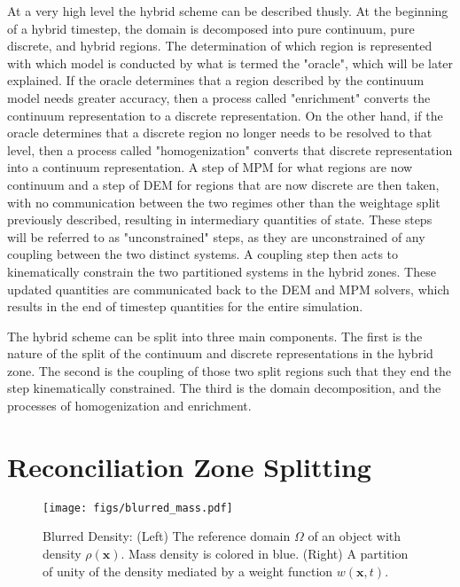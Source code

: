 At a very high level the hybrid scheme can be described thusly. At the beginning of a hybrid timestep, the domain is decomposed into pure continuum, pure discrete, and hybrid regions. The determination of which region is represented with which model is conducted by what is termed the "oracle", which will be later explained. If the oracle determines that a region described by the continuum model needs greater accuracy, then a process called "enrichment" converts the continuum representation to a discrete representation. On the other hand, if the oracle determines that a discrete region no longer needs to be resolved to that level, then a process called "homogenization" converts that discrete representation into a continuum representation. A step of MPM for what regions are now continuum and a step of DEM for regions that are now discrete are then taken, with no communication between the two regimes other than the weightage split previously described, resulting in intermediary quantities of state. These steps will be referred to as "unconstrained" steps, as they are unconstrained of any coupling between the two distinct systems. A coupling step then acts to kinematically constrain the two partitioned systems in the hybrid zones. These updated quantities are communicated back to the DEM and MPM solvers, which results in the end of timestep quantities for the entire simulation.

The hybrid scheme can be split into three main components. The first is the nature of the split of the continuum and discrete representations in the hybrid zone. The second is the coupling of those two split regions such that they end the step kinematically constrained. The third is the domain decomposition, and the processes of homogenization and enrichment. 

\section{Reconciliation Zone Splitting}
\begin{figure}[htp] 
    \centering
    \texttt{[image: figs/blurred\_mass.pdf]}
    \caption{Blurred Density: (Left) The reference domain $\Omega$ of an object with density $\rho(\bm{x})$. Mass density is colored in blue. (Right) A partition of unity of the density mediated by a weight function $w(\bm{x},t)$.}
    \label{blurred_mass}
\end{figure}

